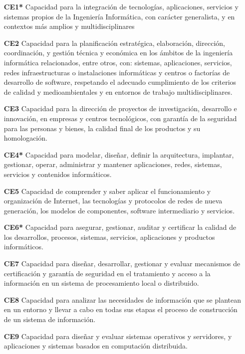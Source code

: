 \begin{itemize}
\item[\textbf{CE1*}] Capacidad para la integración de tecnologías, aplicaciones, servicios
  y sistemas propios de la Ingeniería Informática, con carácter generalista, y
  en contextos más
amplios y multidisciplinares
\item[\textbf{CE2}] Capacidad para la planificación estratégica, elaboración, dirección,
coordinación,
y gestión técnica y económica en los ámbitos de la ingeniería informática
relacionados, entre otros, con: sistemas, aplicaciones, servicios, redes 
infraestructuras o instalaciones informáticas y centros o factorías de
desarrollo de
software, respetando el adecuado cumplimiento de los criterios de calidad y
medioambientales y en entornos de trabajo multidisciplinares.
\item[\textbf{CE3}] Capacidad para la dirección de proyectos de investigación,
  desarrollo e innovación, en empresas y centros tecnológicos, con garantía de
  la seguridad para
las personas y bienes, la calidad final de los productos y su homologación. 
\item [\textbf{CE4*}] Capacidad para modelar, diseñar, definir la arquitectura, implantar,
gestionar,
operar, administrar y mantener aplicaciones, redes, sistemas, servicios y
contenidos informáticos.

\item[\textbf{CE5}] Capacidad de comprender y saber aplicar el funcionamiento y organización
de
Internet, las tecnologías y protocolos de redes de nueva generación, los modelos
de componentes, software intermediario y servicios.

\item[\textbf{CE6*}] Capacidad para asegurar, gestionar, auditar y certificar la calidad de los
desarrollos, procesos, sistemas, servicios, aplicaciones y productos
informáticos.

\item[\textbf{CE7}] Capacidad para diseñar, desarrollar, gestionar y evaluar mecanismos de
certificación y garantía de seguridad en el tratamiento y acceso a la
información
en un sistema de procesamiento local o distribuido.

\item[\textbf{CE8}] Capacidad para analizar las necesidades de información que se plantean en
un
entorno y llevar a cabo en todas sus etapas el proceso de construcción de un
sistema de información.

\item[\textbf{CE9}] Capacidad para diseñar y evaluar sistemas operativos y servidores, y
aplicaciones
y sistemas basados en computación distribuida.


\end{itemize}

